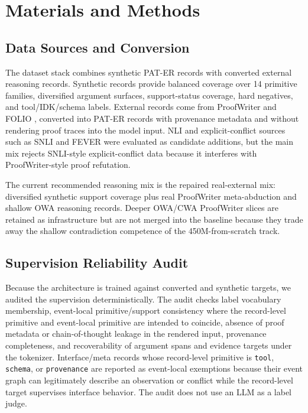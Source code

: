 \section{Materials and Methods}
\label{sec:methods}

\subsection{Data Sources and Conversion}

The dataset stack combines synthetic PAT-ER records with converted external
reasoning records. Synthetic records provide balanced coverage over 14 primitive
families, diversified argument surfaces, support-status coverage, hard
negatives, and tool/IDK/schema labels. External records come from ProofWriter
\citep{tafjord2021proofwriter} and FOLIO \citep{han2024folio}, converted into
PAT-ER records with provenance metadata and without rendering proof traces into
the model input. NLI and explicit-conflict sources such as SNLI
\citep{bowman2015snli} and FEVER \citep{thorne2018fever} were evaluated as
candidate additions, but the main mix rejects SNLI-style explicit-conflict data
because it interferes with ProofWriter-style proof refutation.

The current recommended reasoning mix is the repaired real-external mix:
diversified synthetic support coverage plus real ProofWriter meta-abduction and
shallow OWA reasoning records. Deeper OWA/CWA ProofWriter slices are retained as
infrastructure but are not merged into the baseline because they trade away the
shallow contradiction competence of the 450M-from-scratch track.

\subsection{Supervision Reliability Audit}
\label{subsec:label_reliability}

Because the architecture is trained against converted and synthetic targets, we
audited the supervision deterministically. The audit checks label vocabulary
membership, event-local primitive/support consistency where the record-level
primitive and event-local primitive are intended to coincide, absence of proof
metadata or chain-of-thought leakage in the rendered input, provenance
completeness, and recoverability of argument spans and evidence targets under
the tokenizer. Interface/meta records whose record-level primitive is
\texttt{tool}, \texttt{schema}, or \texttt{provenance} are reported as
event-local exemptions because their event graph can legitimately describe an
observation or conflict while the record-level target supervises interface
behavior. The audit does not use an LLM as a label judge.

